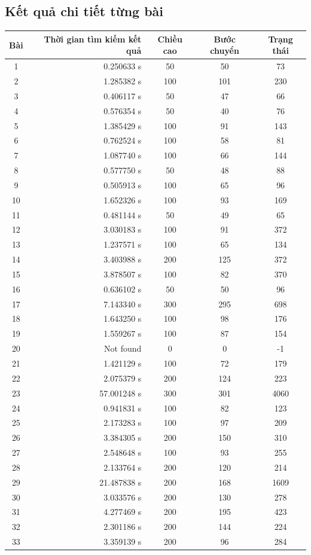 \documentclass[11pt,a4paper]{article}
\begin{document}
\subsection{Kết quả chi tiết từng bài}
\begin{center}
	\begin{tabular}{|c|r|c|c|c|}
		\hline
		Bài & Thời gian tìm kiếm kết quả & Chiều cao & Bước chuyển & Trạng thái \\ \hline
		1   & 0.250633 s	& 50	& 50	& 73 \\ \hline
		2   & 1.285382 s	& 100	& 101	& 230 \\ \hline
		3	& 0.406117 s	& 50 	& 47	& 66 \\ \hline
		4 	& 0.576354 s	& 50	& 40	& 76 \\ \hline
		5	& 1.385429 s	& 100	& 91	& 143\\ \hline
		6	& 0.762524 s	& 100	& 58	& 81 \\ \hline
		7	& 1.087740 s	& 100	& 66	& 144 \\ \hline
		8	& 0.577750 s	& 50	& 48	& 88 \\ \hline
		9	& 0.505913 s	& 100	& 65	& 96 \\ \hline
		10	& 1.652326 s	& 100	& 93	& 169 \\ \hline
		11	& 0.481144 s	& 50	& 49	& 65 \\ \hline
		12	& 3.030183 s	& 100	& 91	& 372 \\ \hline
		13	& 1.237571 s	& 100	& 65	& 134 \\ \hline
		14	& 3.403988 s	& 200	& 125	& 372 \\ \hline
		15	& 3.878507 s	& 100	& 82	& 370 \\ \hline
		16	& 0.636102 s	& 50	& 50	& 96 \\ \hline
		17	& 7.143340 s	& 300	& 295	& 698 \\ \hline
		18	& 1.643250 s	& 100	& 98	& 176 \\ \hline
		19	& 1.559267 s	& 100	& 87	& 154 \\ \hline
		20	& Not found		& 0		& 0		& -1 \\ \hline
		21	& 1.421129 s	& 100	& 72	& 179 \\ \hline
		22	& 2.075379 s	& 200	& 124	& 223 \\ \hline
		23	& 57.001248 s	& 300	& 301	& 4060 \\ \hline
		24	& 0.941831 s	& 100	& 82	& 123 \\ \hline
		25	& 2.173283 s	& 100	& 97	& 209 \\ \hline
		26	& 3.384305 s	& 200	& 150	& 310 \\ \hline
		27	& 2.548648 s	& 100	& 93	& 255 \\ \hline
		28	& 2.133764 s	& 200	& 120	& 214 \\ \hline
		29	& 21.487838 s	& 200	& 168	& 1609 \\ \hline
		30	& 3.033576 s	& 200	& 130	& 278 \\ \hline
		31	& 4.277469 s	& 200	& 195	& 423 \\ \hline
		32	& 2.301186 s	& 200	& 144	& 224 \\ \hline
		33	& 3.359139 s	& 200	& 96	& 284 \\ \hline	
	\end{tabular}	
\end{center}
\newpage
\end{document}
